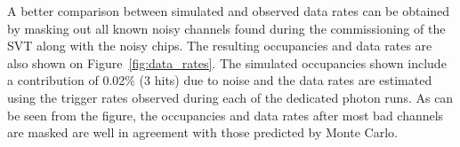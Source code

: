 %

A better comparison between simulated and observed data rates can be obtained
by masking out all known noisy channels found during the commissioning of the 
SVT along with the noisy chips.  The resulting occupancies and data rates are also shown on 
Figure~\ref{fig:data_rates}. The simulated occupancies shown include a contribution
of 0.02\% (3 hits) due to noise and the data rates are estimated using the trigger
rates observed during each of the dedicated photon runs.  As can be seen from the
figure, the occupancies and data rates after most bad channels are masked are well
in agreement with those predicted by Monte Carlo.
